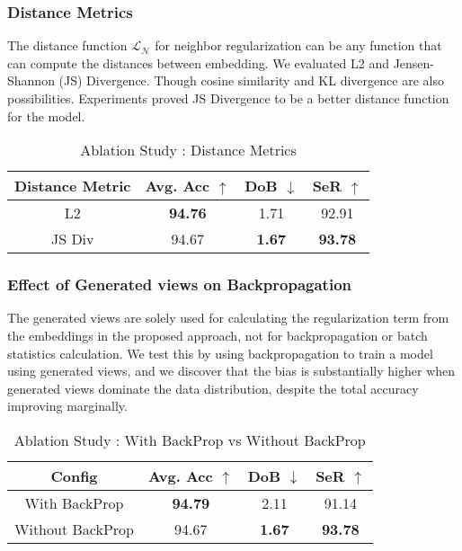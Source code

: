 \documentclass[runningheads]{llncs}
\begin{document}
\subsubsection{Distance Metrics}
The distance function $\mathcal{L}_{\mathcal{N}}$ for neighbor regularization can be any function that can compute the distances between embedding. We evaluated L2 and Jensen-Shannon (JS) Divergence. Though cosine similarity and KL divergence are also possibilities. Experiments proved JS Divergence to be a better distance function for the model.
\begin{table}[H]
    \centering
    \caption{Ablation Study : Distance Metrics}
    \label{tab:ablate_dist}
    \begin{tabular}{cccc} 
    \toprule
    \textbf{Distance Metric} & \textbf{Avg. Acc $\uparrow$} & \textbf{DoB $\downarrow$} & \textbf{SeR $\uparrow$} \\ \midrule
    L2 & \textbf{94.76} & 1.71 & 92.91 \\
    JS Div & 94.67 & \textbf{1.67} & \textbf{93.78}\\
    \bottomrule
    \end{tabular}
\end{table}

\subsubsection{Effect of Generated views on Backpropagation}
The generated views are solely used for calculating the regularization term from the embeddings in the proposed approach, not for backpropagation or batch statistics calculation. We test this by using backpropagation to train a model using generated views, and we discover that the bias is substantially higher when generated views dominate the data distribution, despite the total accuracy improving marginally.
\begin{table}[H]
    \centering
    \caption{Ablation Study : With BackProp vs Without BackProp}
    \label{tab:ablate_backprop}
    \begin{tabular}{cccc} 
    \toprule
    \textbf{Config} & \textbf{Avg. Acc $\uparrow$} & \textbf{DoB $\downarrow$} & \textbf{SeR $\uparrow$} \\ \midrule
    With BackProp & \textbf{94.79} & 2.11 & 91.14 \\
    Without BackProp & 94.67 & \textbf{1.67} & \textbf{93.78}\\
    \bottomrule
    \end{tabular}
\end{table}
\end{document}
